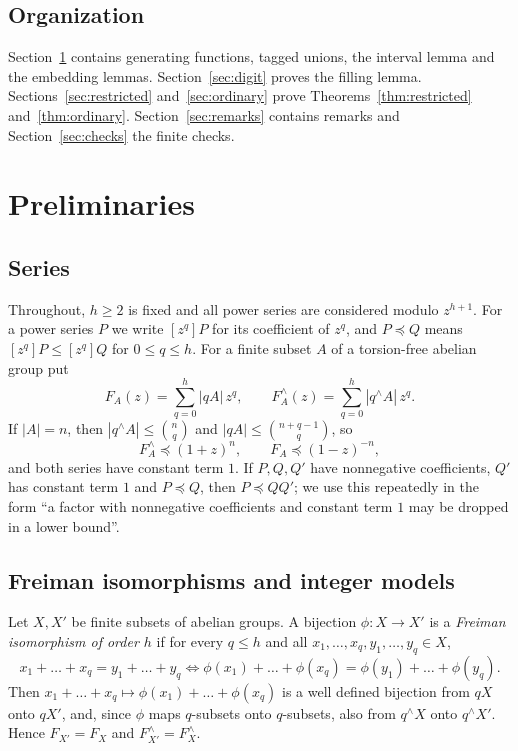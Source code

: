 \documentclass[11pt]{amsart}
\theoremstyle{definition}
\theoremstyle{remark}
\numberwithin{equation}{section}
\newcommand{\res}[2]{#1^{\wedge}#2}
\newcommand{\Fr}{F^{\wedge}}
\newcommand{\coef}[1]{[z^{#1}]}
\newcommand{\cle}{\preceq}
\begin{document}
\subsection*{Organization}
Section~\ref{sec:prelim} contains generating functions, tagged unions, the interval lemma and the embedding lemmas. Section~\ref{sec:digit} proves the filling lemma. Sections~\ref{sec:restricted} and~\ref{sec:ordinary} prove Theorems~\ref{thm:restricted} and~\ref{thm:ordinary}. Section~\ref{sec:remarks} contains remarks and Section~\ref{sec:checks} the finite checks.

\section{Preliminaries}\label{sec:prelim}

\subsection{Series}
Throughout, $h\ge 2$ is fixed and all power series are considered modulo $z^{h+1}$. For a power series $P$ we write $\coef qP$ for its coefficient of $z^q$, and $P\cle Q$ means $\coef qP\le\coef qQ$ for $0\le q\le h$. For a finite subset $A$ of a torsion-free abelian group put
\[
F_A(z)=\sum_{q=0}^h|qA|\,z^q,\qquad \Fr_A(z)=\sum_{q=0}^h|\res qA|\,z^q.
\]
If $|A|=n$, then $|\res qA|\le\binom nq$ and $|qA|\le\binom{n+q-1}{q}$, so
\begin{equation}\label{eq:multiset-bound}
\Fr_A\cle(1+z)^n,\qquad F_A\cle(1-z)^{-n},
\end{equation}
and both series have constant term $1$. If $P,Q,Q'$ have nonnegative coefficients, $Q'$ has constant term $1$ and $P\cle Q$, then $P\cle QQ'$; we use this repeatedly in the form ``a factor with nonnegative coefficients and constant term $1$ may be dropped in a lower bound''.

\subsection{Freiman isomorphisms and integer models}
Let $X,X'$ be finite subsets of abelian groups. A bijection $\phi\colon X\to X'$ is a \emph{Freiman isomorphism of order $h$} if for every $q\le h$ and all $x_1,\dots,x_q,y_1,\dots,y_q\in X$,
\[
x_1+\dots+x_q=y_1+\dots+y_q\iff \phi(x_1)+\dots+\phi(x_q)=\phi(y_1)+\dots+\phi(y_q).
\]
Then $x_1+\dots+x_q\mapsto\phi(x_1)+\dots+\phi(x_q)$ is a well defined bijection from $qX$ onto $qX'$, and, since $\phi$ maps $q$-subsets onto $q$-subsets, also from $\res qX$ onto $\res qX'$. Hence $F_{X'}=F_X$ and $\Fr_{X'}=\Fr_X$.
\end{document}
